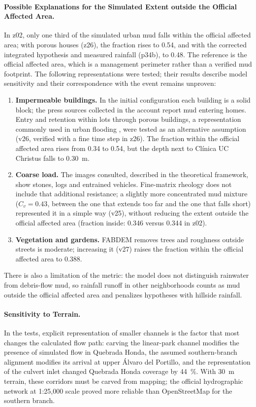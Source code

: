 \paragraph{Possible Explanations for the Simulated Extent outside the Official Affected Area.} In z02, only one third of the simulated urban mud falls within the official affected area; with porous houses (z26), the fraction rises to 0.54, and with the corrected integrated hypothesis and measured rainfall (p34b), to 0.48. The reference is the official affected area, which is a management perimeter rather than a verified mud footprint. The following representations were tested; their results describe model sensitivity and their correspondence with the event remains unproven:
\begin{enumerate}
\item \textbf{Impermeable buildings.} In the initial configuration each building is a solid block; the press sources collected in the account report mud entering homes. Entry and retention within lots through porous buildings, a representation commonly used in urban flooding \citep{schubert2012}, were tested as an alternative assumption (v26, verified with a fine time step in z26). The fraction within the official affected area rises from 0.34 to 0.54, but the depth next to Clínica UC Christus falls to \SI{0.30}{m}.
\item \textbf{Coarse load.} The images consulted, described in the theoretical framework, show stones, logs and entrained vehicles. Fine-matrix rheology does not include that additional resistance; a slightly more concentrated mud mixture ($C_v=0.43$, between the one that extends too far and the one that falls short) represented it in a simple way (v25), without reducing the extent outside the official affected area (fraction inside: 0.346 versus 0.344 in z02).
\item \textbf{Vegetation and gardens.} FABDEM removes trees and roughness outside streets is moderate; increasing it (v27) raises the fraction within the official affected area to 0.388.
\end{enumerate}
There is also a limitation of the metric: the model does not distinguish rainwater from debris-flow mud, so rainfall runoff in other neighborhoods counts as mud outside the official affected area and penalizes hypotheses with hillside rainfall.

\paragraph{Sensitivity to Terrain.} In the tests, explicit representation of smaller channels is the factor that most changes the calculated flow path: carving the linear-park channel modifies the presence of simulated flow in Quebrada Honda, the assumed southern-branch alignment modifies its arrival at upper Álvaro del Portillo, and the representation of the culvert inlet changed Quebrada Honda coverage by \SI{44}{\percent}. With \SI{30}{m} terrain, these corridors must be carved from mapping; the official hydrographic network at 1:25,000 scale proved more reliable than OpenStreetMap for the southern branch.

